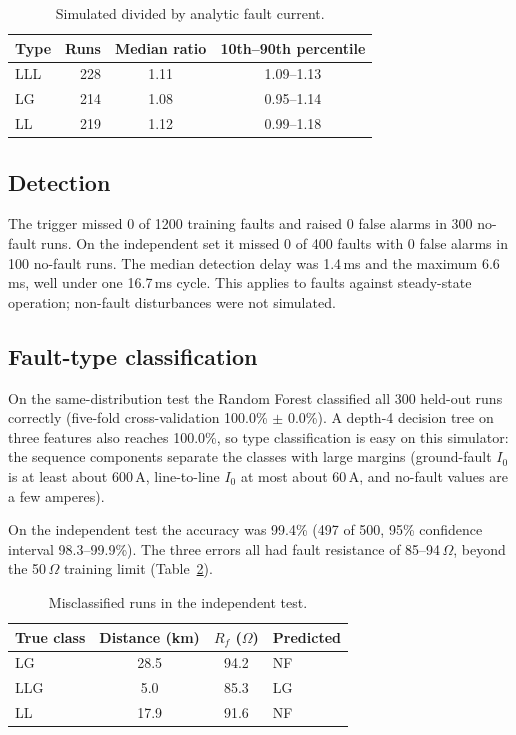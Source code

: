 \documentclass[11pt,a4paper]{article}
\begin{document}
\begin{table}[H]\centering\small
\caption{Simulated divided by analytic fault current.}\label{tab:theory}
\begin{tabular}{lrcc}\toprule
Type & Runs & Median ratio & 10th--90th percentile\\\midrule
LLL & 228 & 1.11 & 1.09--1.13\\
LG & 214 & 1.08 & 0.95--1.14\\
LL & 219 & 1.12 & 0.99--1.18\\\bottomrule
\end{tabular}
\end{table}

\subsection{Detection}
The trigger missed 0 of 1200 training faults and raised 0 false alarms in 300 no-fault runs. On the independent set it missed 0 of 400 faults with 0 false alarms in 100 no-fault runs. The median detection delay was 1.4\,ms and the maximum 6.6\,ms, well under one 16.7\,ms cycle. This applies to faults against steady-state operation; non-fault disturbances were not simulated.

\subsection{Fault-type classification}
On the same-distribution test the Random Forest classified all 300 held-out runs correctly (five-fold cross-validation 100.0\% $\pm$ 0.0\%). A depth-4 decision tree on three features also reaches 100.0\%, so type classification is easy on this simulator: the sequence components separate the classes with large margins (ground-fault $I_0$ is at least about 600\,A, line-to-line $I_0$ at most about 60\,A, and no-fault values are a few amperes).

On the independent test the accuracy was 99.4\% (497 of 500, 95\% confidence interval 98.3--99.9\%). The three errors all had fault resistance of 85--94\,$\Omega$, beyond the 50\,$\Omega$ training limit (Table~\ref{tab:err}).

\begin{table}[H]\centering\small
\caption{Misclassified runs in the independent test.}\label{tab:err}
\begin{tabular}{lccl}\toprule
True class & Distance (km) & $R_f$ ($\Omega$) & Predicted\\\midrule
LG & 28.5 & 94.2 & NF\\
LLG & 5.0 & 85.3 & LG\\
LL & 17.9 & 91.6 & NF\\
\bottomrule
\end{tabular}
\end{table}
\end{document}
